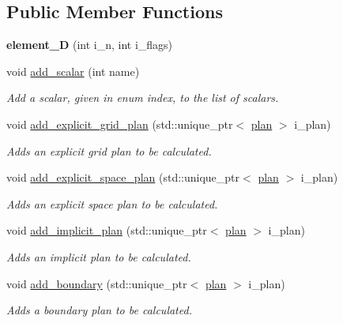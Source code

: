 \subsection*{Public Member Functions}
\begin{DoxyCompactItemize}
\item 
\hypertarget{classelement_1_1element__1_d_ac07b97231a5fc86cd2fab28495f6894f}{{\bfseries element\-\_\-D} (int i\-\_\-n, int i\-\_\-flags)}\label{classelement_1_1element__1_d_ac07b97231a5fc86cd2fab28495f6894f}

\item 
void \hyperlink{classelement_1_1element__1_d_a251eab845adcdf52ab580f6ab9a30ab8}{add\-\_\-scalar} (int name)
\begin{DoxyCompactList}\small\item\em Add a scalar, given in enum index, to the list of scalars. \end{DoxyCompactList}\item 
void \hyperlink{classelement_1_1element_ac3039d96af5371a1455827823250492c}{add\-\_\-explicit\-\_\-grid\-\_\-plan} (std\-::unique\-\_\-ptr$<$ \hyperlink{classplan}{plan} $>$ i\-\_\-plan)
\begin{DoxyCompactList}\small\item\em Adds an explicit grid plan to be calculated. \end{DoxyCompactList}\item 
void \hyperlink{classelement_1_1element_a421ed3d85ec5c88954cceec89b776ffe}{add\-\_\-explicit\-\_\-space\-\_\-plan} (std\-::unique\-\_\-ptr$<$ \hyperlink{classplan}{plan} $>$ i\-\_\-plan)
\begin{DoxyCompactList}\small\item\em Adds an explicit space plan to be calculated. \end{DoxyCompactList}\item 
void \hyperlink{classelement_1_1element_a44598277c572a852065bf99ea50b8dda}{add\-\_\-implicit\-\_\-plan} (std\-::unique\-\_\-ptr$<$ \hyperlink{classplan}{plan} $>$ i\-\_\-plan)
\begin{DoxyCompactList}\small\item\em Adds an implicit plan to be calculated. \end{DoxyCompactList}\item 
void \hyperlink{classelement_1_1element_a0bf9ce6eff52425e8645340174840e07}{add\-\_\-boundary} (std\-::unique\-\_\-ptr$<$ \hyperlink{classplan}{plan} $>$ i\-\_\-plan)
\begin{DoxyCompactList}\small\item\em Adds a boundary plan to be calculated. \end{DoxyCompactList}\item 

\end{DoxyCompactItemize}

